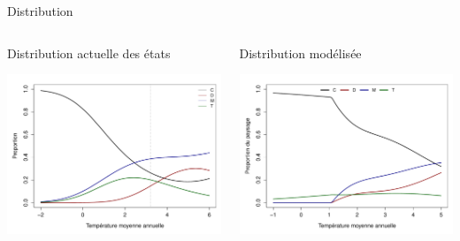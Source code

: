 \documentclass{eecslides}
\begin{document}
		\begin{frame}{Distribution}
		\begin{columns}
			\begin{column}{0.5\textwidth}
				Distribution actuelle des états
								\begin{center}
					\includegraphics[height=0.4\textheight]{SDM}
				\end{center}
			\end{column}
			\begin{column}{0.5\textwidth}
				Distribution modélisée
				\begin{center}
					\includegraphics[height=0.4\textheight]{SDMeq}
				\end{center}
			\end{column}
		\end{columns}	    	
	\end{frame}
\end{document}
